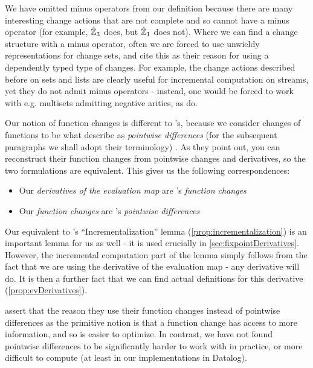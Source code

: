 We have omitted minus operators from our definition because
there are many interesting change actions that are not complete and so cannot 
have a minus operator (for example, $\hat{\mathbb{Z}}_3$ does, but $\hat{\mathbb{Z}}_1$ does
not). Where we can find a change structure with a minus operator, often we are
forced to use unwieldy representations for change sets, and
\citeauthor{cai2014changes} cite this as their reason for using a dependently
typed type of changes. For example, the change actions described before on sets and lists are clearly
useful for incremental computation on streams, yet they do not admit minus operators - instead, one would
be forced to work with e.g. multisets admitting negative arities, as \citeauthor{cai2014changes} do.

Our notion of function changes is different to \citeauthor{cai2014changes}'s,
because we consider changes of functions to be what \citeauthor{cai2014changes} describe as
\textit{pointwise differences} (for the subsequent paragraphs we shall adopt
their terminology) \autocite[See][section 2.2]{cai2014changes}. As they point out, you can reconstruct their
function changes from pointwise changes and derivatives, so the two formulations
are equivalent. This gives us the following correspondences:
\begin{itemize}
  \item Our \textit{derivatives of the
      evaluation map} are \citeauthor{cai2014changes}'s \textit{function changes}
  \item Our \textit{function changes} are \citeauthor{cai2014changes}'s \textit{pointwise differences}
\end{itemize}

Our equivalent to \citeauthor{cai2014changes}'s ``Incrementalization'' lemma
(\cref{prop:incrementalization}) is an important lemma for us as well - it is used
crucially in \cref{sec:fixpointDerivatives}. However, the incremental computation part of
the lemma simply follows from the fact that we are using the derivative of the
evaluation map - any derivative will do. It is then a further fact that we can
find actual definitions for this derivative (\cref{prop:evDerivatives}).

\citeauthor{cai2014changes} assert that the reason they use their function changes instead of pointwise
differences as the primitive notion is that a function change has access to more
information, and so is easier to optimize. In contrast, we have not found pointwise differences to be
significantly harder to work with in practice, or more difficult to compute (at least in our implementations
in Datalog).

